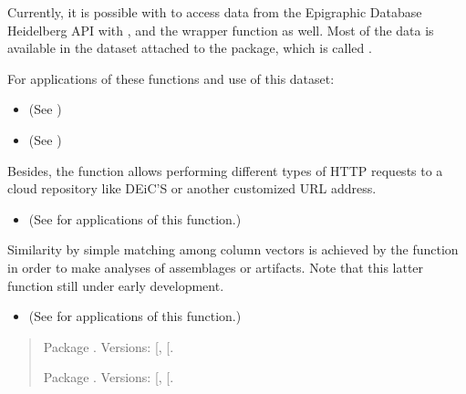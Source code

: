\documentclass[a4paper,12pt,english]{sphinxhowto}
\begin{document}
Currently, it is possible with  to access data from the Epigraphic Database Heidelberg API
with , and the wrapper function  as well. Most of the data is available
in the dataset attached to the package, which is called .

For applications of these functions and use of this dataset:
\begin{itemize}
\item {} 
(See {\hyperref[\detokenize{Epigraphic:edh}]{}})

\item {} 
(See {\hyperref[\detokenize{EpigraphicNetwork:edh-net}]{}})

\end{itemize}


Besides, the  function allows performing different types of HTTP requests to a cloud
repository like DEiC’S  or another customized URL address.
\begin{itemize}
\item {} 
(See {\hyperref[\detokenize{Sciencedata_dk:deic-sddk}]{}} for applications of this function.)

\end{itemize}


Similarity by simple matching among column vectors is achieved by the  function in order
to make analyses of assemblages or artifacts. Note that this latter function still under early
development.
\begin{itemize}
\item {} 
(See {\hyperref[\detokenize{EpigraphicNetwork:edh-net}]{}} for applications of this function.)

\end{itemize}

\begin{quote}




Package . Versions:
{[}\sphinxhref{https://CRAN.R-project.org/package=multigraph}{CRAN}{]},
{[}\sphinxhref{https://github.com/mplex/multigraph}{GitHub}{]}.

Package . Versions:
{[}\sphinxhref{https://CRAN.R-project.org/package=multiplex}{CRAN}{]},
{[}\sphinxhref{https://github.com/mplex/multiplex}{GitHub}{]}.


\end{quote}
\end{document}
